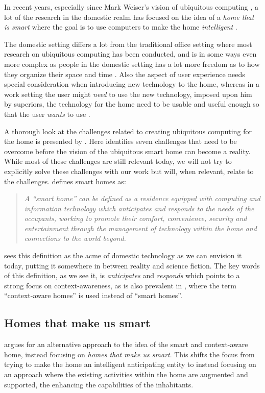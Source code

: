 In recent years, especially since Mark Weiser's vision of ubiquitous computing \citep{weiser1991computer}, a lot of the research in the domestic realm has focused on the idea of a \emph{home that is smart} where the goal is to use computers to make the home \emph{intelligent} \citep{taylor2007homes}.

The domestic setting differs a lot from the traditional office setting where most research on ubiquitous computing has been conducted, and is in some ways even more complex as people in the domestic setting has a lot more freedom as to how they organize their space and time \cite{meyer2003survey}.
Also the aspect of user experience needs special consideration when introducing new technology to the home, whereas in a work setting the user might \emph{need} to use the new technology, imposed upon him by superiors, the technology for the home need to be usable and useful enough so that the user \emph{wants} to use \citep{meyer2003survey}.

A thorough look at the challenges related to creating ubiquitous computing for the home is presented by \citet{edwards2001home}.
Here \citeauthor{edwards2001home} identifies seven challenges that need to be overcome before the vision of the ubiquitous smart home can become a reality. 
While most of these challenges are still relevant today, we will not try to explicitly solve these challenges with our work but will, when relevant, relate to the challenges.
\blank
\citet{aldrich2003smart} defines smart homes as:

\begin{quotation}
\emph{A ``smart home'' can be defined as a residence equipped with computing and information technology which anticipates and responds to the needs of the occupants, working to promote their comfort, convenience, security and entertainment through the management of technology within the home and connections to the world beyond.}
\end{quotation}
\citeauthor{aldrich2003smart} sees this definition as the acme of domestic technology as we can envision it today, putting it somewhere in between reality and science fiction.
The key words of this definition, as we see it, is \emph{anticipates} and \emph{responds} which points to a strong focus on context-awareness, as is also prevalent in \citep{meyer2003survey}, where the term ``context-aware homes'' is used instead of ``smart homes''. 

\subsection{Homes that make us smart}
\citet{taylor2007homes} argues for an alternative approach to the idea of the smart and context-aware home, instead focusing on \emph{homes that make us smart}. 
This shifts the focus from trying to make the home an intelligent anticipating entity to instead focusing on an approach where the existing activities within the home are augmented and supported, the enhancing the capabilities of the inhabitants.

